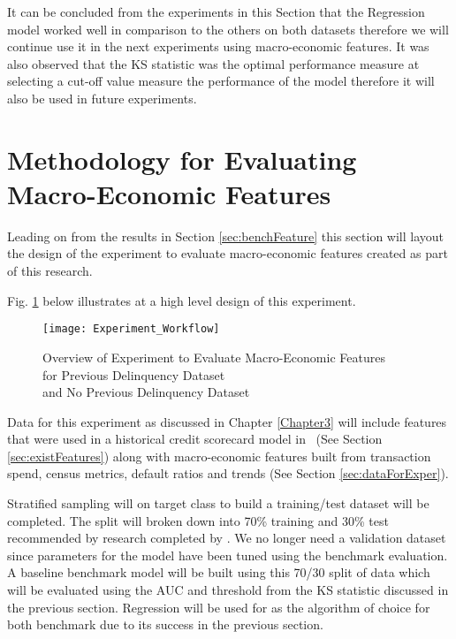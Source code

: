 It can be concluded from the experiments in this Section that the Regression model worked well in comparison to the others on both datasets therefore we will continue use it in the next experiments using macro-economic features. It was also observed that the KS statistic was the optimal performance measure at selecting a cut-off value measure the performance of the model therefore it will also be used in future experiments.

\section{Methodology for Evaluating Macro-Economic Features}
Leading on from the results in Section \ref{sec:benchFeature} this section will layout the design of the experiment to evaluate macro-economic features created as part of this research. 
 
Fig. \ref{fig:Experiment_Workflow} below illustrates at a high level design of this experiment. 

\begin{figure}[H]
	\texttt{[image: Experiment\_Workflow]}
	\caption{Overview of Experiment to Evaluate Macro-Economic Features \\
		for Previous Delinquency Dataset \\
		and No Previous Delinquency Dataset}
	\label{fig:Experiment_Workflow}
\end{figure}


Data for this experiment as discussed in Chapter \ref{Chapter3} will include features that were used in a historical credit scorecard model in \subjectname\ (See Section \ref{sec:existFeatures}) along with macro-economic features built from transaction spend, census metrics, default ratios and trends (See Section \ref{sec:dataForExper}). 

Stratified sampling will on target class to build a training/test dataset will be completed. The split will broken down into 70\% training and 30\% test recommended by research completed by \cite{siddiqi_credit_2012}. We no longer need a validation dataset since parameters for the model have been tuned using the benchmark evaluation. A baseline benchmark model will be built using this 70/30 split of data which will be evaluated using the AUC and threshold from the KS statistic discussed in the previous section. Regression will be used for as the algorithm of choice for both benchmark due to its success in the previous section.

